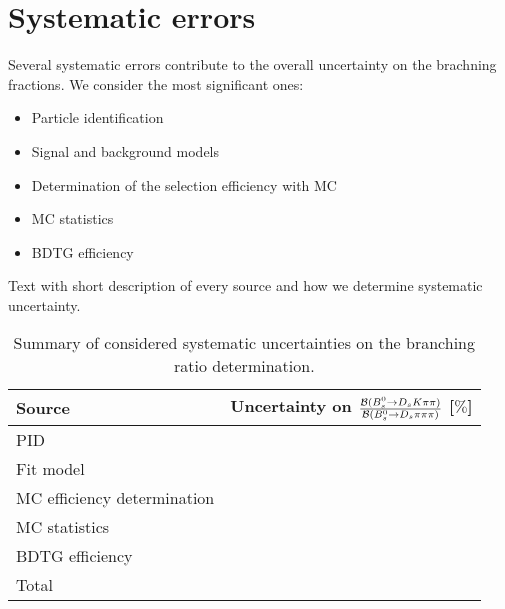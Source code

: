 \section{Systematic errors}
\label{sec: systematics}

Several systematic errors contribute to the overall uncertainty on the brachning fractions. We consider the most significant ones:

\begin{itemize}

\item Particle identification

\item Signal and background models

\item Determination of the selection efficiency with MC

\item MC statistics

\item BDTG efficiency

\end{itemize} 


Text with short description of every source and how we determine systematic uncertainty.

\begin{table}[h!]
\centering
\begin{tabular}{l c}
Source  & Uncertainty on $\frac{\mathcal{B}({{B}^0_{s}}\rightarrow{\ensuremath{{D}_{s}}}{\ensuremath{K}}{\ensuremath{\pi}}{\ensuremath{\pi}})}{\mathcal{B}({{B}^0_{s}}\rightarrow{\ensuremath{{D}_{s}}}{\ensuremath{\pi}}{\ensuremath{\pi}}{\ensuremath{\pi}})}$ [$\%$]\\
\hline
PID & \\
Fit model & \\
MC efficiency determination & \\
MC statistics & \\
BDTG efficiency & \\
\hline
Total & \\
\hline
\end{tabular}
\caption{Summary of considered systematic uncertainties on the branching ratio determination.}
\label{tab: systTab}
\end{table}

